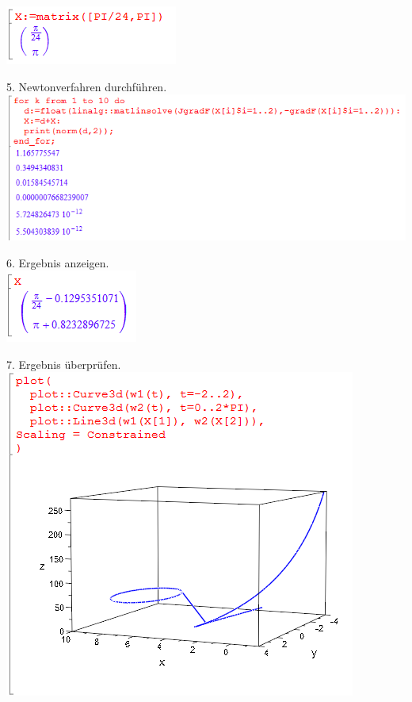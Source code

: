 \documentclass[11pt,final]{scrreprt}
\begin{document}
\includegraphics[scale=2.2]{images/abstandsproblem/start.png}

5. Newtonverfahren durchführen.\\

\includegraphics[scale=2.2]{images/abstandsproblem/newton.png}

6. Ergebnis anzeigen.\\

\includegraphics[scale=2.2]{images/abstandsproblem/result.png}

7. Ergebnis überprüfen.\\

\includegraphics[scale=2.2]{images/abstandsproblem/plot.png}
\end{document}
